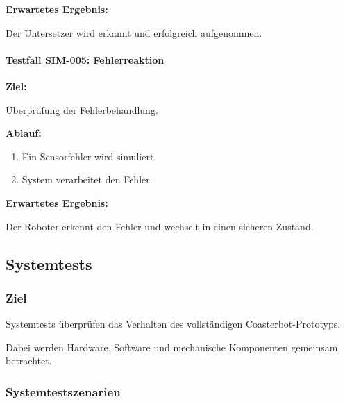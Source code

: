 \textbf{Erwartetes Ergebnis:}

Der Untersetzer wird erkannt und erfolgreich aufgenommen.

\paragraph{Testfall SIM-005:
Fehlerreaktion}\label{testfall-sim-005-fehlerreaktion}

\textbf{Ziel:}

Überprüfung der Fehlerbehandlung.

\textbf{Ablauf:}

\begin{enumerate}
\def\labelenumi{\arabic{enumi}.}
\tightlist
\item
  Ein Sensorfehler wird simuliert.
\item
  System verarbeitet den Fehler.
\end{enumerate}

\textbf{Erwartetes Ergebnis:}

Der Roboter erkennt den Fehler und wechselt in einen sicheren Zustand.

\subsection{Systemtests}\label{systemtests-1}

\subsubsection{Ziel}\label{ziel-3}

Systemtests überprüfen das Verhalten des vollständigen
Coasterbot-Prototyps.

Dabei werden Hardware, Software und mechanische Komponenten gemeinsam
betrachtet.

\subsubsection{Systemtestszenarien}\label{systemtestszenarien}

